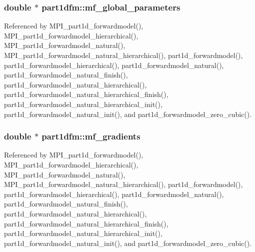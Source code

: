 \subsubsection[{\texorpdfstring{mf\+\_\+global\+\_\+parameters}{mf_global_parameters}}]{\setlength{\rightskip}{0pt plus 5cm}double $\ast$ part1dfm\+::mf\+\_\+global\+\_\+parameters}\hypertarget{structpart1dfm_a783b431fe34721327a67300da93cdd07}{}\label{structpart1dfm_a783b431fe34721327a67300da93cdd07}


Referenced by M\+P\+I\+\_\+part1d\+\_\+forwardmodel(), M\+P\+I\+\_\+part1d\+\_\+forwardmodel\+\_\+hierarchical(), M\+P\+I\+\_\+part1d\+\_\+forwardmodel\+\_\+natural(), M\+P\+I\+\_\+part1d\+\_\+forwardmodel\+\_\+natural\+\_\+hierarchical(), part1d\+\_\+forwardmodel(), part1d\+\_\+forwardmodel\+\_\+hierarchical(), part1d\+\_\+forwardmodel\+\_\+natural(), part1d\+\_\+forwardmodel\+\_\+natural\+\_\+finish(), part1d\+\_\+forwardmodel\+\_\+natural\+\_\+hierarchical(), part1d\+\_\+forwardmodel\+\_\+natural\+\_\+hierarchical\+\_\+finish(), part1d\+\_\+forwardmodel\+\_\+natural\+\_\+hierarchical\+\_\+init(), part1d\+\_\+forwardmodel\+\_\+natural\+\_\+init(), and part1d\+\_\+forwardmodel\+\_\+zero\+\_\+cubic().

\subsubsection[{\texorpdfstring{mf\+\_\+gradients}{mf_gradients}}]{\setlength{\rightskip}{0pt plus 5cm}double $\ast$ part1dfm\+::mf\+\_\+gradients}\hypertarget{structpart1dfm_ada4048863eed80775717e783b8d02ec5}{}\label{structpart1dfm_ada4048863eed80775717e783b8d02ec5}


Referenced by M\+P\+I\+\_\+part1d\+\_\+forwardmodel(), M\+P\+I\+\_\+part1d\+\_\+forwardmodel\+\_\+hierarchical(), M\+P\+I\+\_\+part1d\+\_\+forwardmodel\+\_\+natural(), M\+P\+I\+\_\+part1d\+\_\+forwardmodel\+\_\+natural\+\_\+hierarchical(), part1d\+\_\+forwardmodel(), part1d\+\_\+forwardmodel\+\_\+hierarchical(), part1d\+\_\+forwardmodel\+\_\+natural(), part1d\+\_\+forwardmodel\+\_\+natural\+\_\+finish(), part1d\+\_\+forwardmodel\+\_\+natural\+\_\+hierarchical(), part1d\+\_\+forwardmodel\+\_\+natural\+\_\+hierarchical\+\_\+finish(), part1d\+\_\+forwardmodel\+\_\+natural\+\_\+hierarchical\+\_\+init(), part1d\+\_\+forwardmodel\+\_\+natural\+\_\+init(), and part1d\+\_\+forwardmodel\+\_\+zero\+\_\+cubic().

